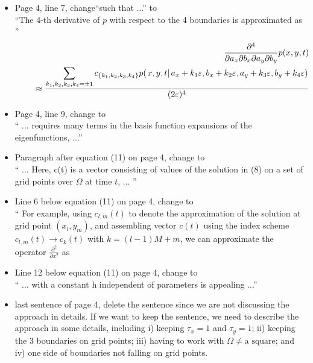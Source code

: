 \documentclass[12pt]{article}
\begin{document}
\begin{itemize}
\item Page 4, line 7, change``such that ...'' to \\
``The 4-th derivative of $p$ with respect to the 4 boundaries is approximated as '' \\
\begin{eqnarray} 
& & \frac{\partial^4}{\partial a_x \partial b_x \partial a_y \partial b_y} p(x, y, t) 
\nonumber \\
& & \hspace*{0.5cm} \approx \frac{\displaystyle \sum_{k_1, k_2, k_3, k_4 = \pm 1}
c_{\{ k_1, k_2, k_3, k_4 \} } p(\left. x, y, t \right| a_x+k_1 \varepsilon, b_x+k_2 \varepsilon, 
a_y+k_3 \varepsilon, b_y+k_4 \varepsilon) }{(2 \varepsilon )^4} 
\nonumber
\end{eqnarray}

\item Page 4, line 9, change to \\
`` ... requires many terms in the basis function expansions of the eigenfunctions, ...''

\item Paragraph after equation (11) on page 4, change to \\
`` ... Here, c(t) is a vector consisting of values of the solution in (8) on a set of grid points
 over $\Omega$ at time $t$, ... ''

\item Line 6 below equation (11) on page 4, change to \\
`` For example, using $c_{l, m}(t) $ 
to denote the approximation of the solution at grid point $(x_l, y_m)$, and assembling 
vector $c(t)$ using the index scheme $c_{l, m}(t) \rightarrow c_k(t)$ with  
$k=  (l-1) M + m$, we can approximate the operator $\frac{\partial^2 }{\partial x^2} $ as 

\item Line 12 below equation (11) on page 4, change to \\
`` ... with a constant h independent of parameters is appealing ...''

\item last sentence of page 4, delete the sentence since we are not discussing 
the approach in details. If we want to keep the sentence, we need to describe the approach
in some details, including i) keeping $\tau_x =1$ and 
$\tau_y = 1$; ii) keeping the 3 boundaries on grid points; iii) having to work with 
$\Omega \ne \mbox{a square}$; and iv) one side of boundaries not falling on grid points. 


\end{itemize}
\end{document}
